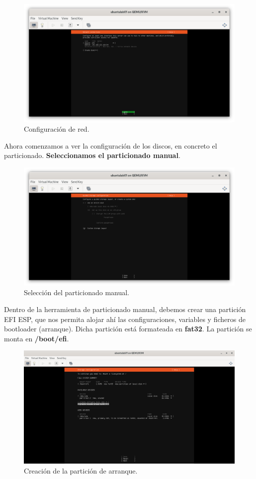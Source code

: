 \begin{figure}[H]
	\centering
	\includegraphics[scale=0.40]{06}
	\caption{Configuración de red.}
\end{figure}

Ahora comenzamos a ver la configuración de los discos, en concreto el particionado. \textbf{Seleccionamos el particionado manual}.

\begin{figure}[H]
	\centering
	\includegraphics[scale=0.40]{07}
	\caption{Selección del particionado manual.}
\end{figure}

Dentro de la herramienta de particionado manual, debemos crear una partición EFI ESP, que nos permita alojar ahí las configuraciones, variables y ficheros de bootloader (arranque). Dicha partición está formateada en \textbf{fat32}. La partición se monta en \textbf{/boot/efi}.

\begin{figure}[H]
	\centering
	\includegraphics[scale=0.30]{08}
	\caption{Creación de la partición de arranque.}
\end{figure}

